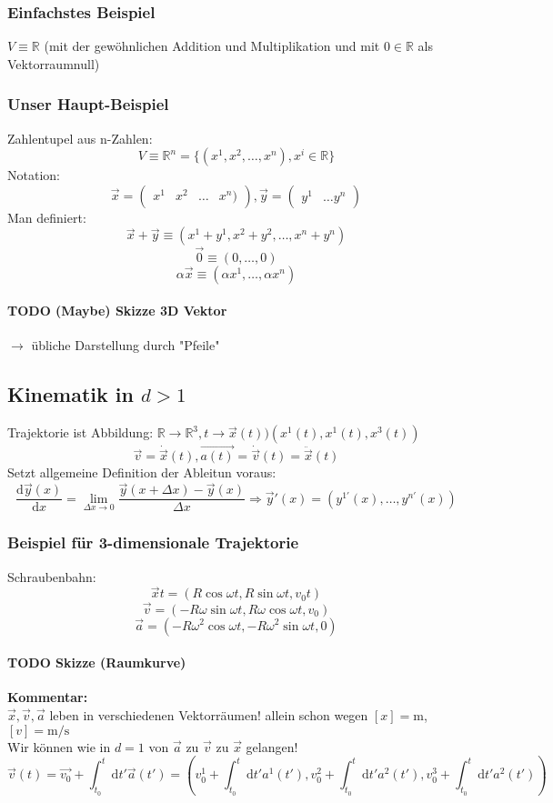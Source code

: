 \documentclass[a4paper]{scrartcl}
\theoremstyle{definition}
\theoremstyle{plain}
\theoremstyle{remark}
\begin{document}
\subsubsection{Einfachstes Beispiel}
\label{sec-2-4-1}
$V\equiv \mathbb{R}$ (mit der gewöhnlichen Addition und Multiplikation und mit $0\in\mathbb{R}$ als Vektorraumnull)
\subsubsection{Unser Haupt-Beispiel}
\label{sec-2-4-2}
Zahlentupel aus n-Zahlen:
\[V\equiv \mathbb{R}^n = \{(x^1,x^2,\ldots,x^n), x^i \in\mathbb{R}\}\]
Notation:
\[\vec{x} = \begin{pmatrix} x^1& x^2 & \ldots & x^n)\end{pmatrix}, \vec{y} = \begin{pmatrix} y^1 & \ldots y^n \end{pmatrix}\]
Man definiert:
\[\vec{x} + \vec{y} \equiv (x^1 + y^1, x^2 + y^2, \ldots, x^n + y^n)\]
\[\vec{0} \equiv (0,\ldots,0)\]
\[\alpha \vec{x} \equiv (\alpha x^1, \ldots, \alpha x^n)\]
\paragraph{{\bfseries\sffamily TODO} (Maybe) Skizze 3D Vektor}
\label{sec-2-4-2-1}
$\rightarrow$ übliche Darstellung durch "Pfeile"
\subsection{Kinematik in $d>1$}
\label{sec-2-5}
Trajektorie ist Abbildung: $\mathbb{R} \to \mathbb{R}^3, t\to \vec{x}(t) ) (x^1(t),x^1(t),x^3(t))$
\[\vec{v} = \dot{\vec{x}}(t), \vec{a(t)} = \dot{\vec{v}}(t) = \ddot{\vec{x}}(t)\]
Setzt allgemeine Definition der Ableitun voraus:
\[\frac{\mathrm{d}\vec{y}(x)}{\mathrm{d}x} = \lim_{\Delta x \to 0} \frac{\vec{y}(x + \Delta x) - \vec{y}(x)}{\Delta x}  \Rightarrow \vec{y}'(x) = (y^{1'}(x), \ldots,y^{n'}(x))\]
\subsubsection{Beispiel für 3-dimensionale Trajektorie}
\label{sec-2-5-1}
Schraubenbahn:
\[\vec{x}t = (R\cos{\omega t},R\sin{\omega t}, v_0 t)\]
\[\vec{v} = (-R\omega\sin{\omega t}, R\omega\cos{\omega t}, v_0)\]
\[\vec{a} = (-R\omega^2\cos{\omega t}, -R\omega^2\sin{\omega t}, 0)\]
\paragraph{{\bfseries\sffamily TODO} Skizze (Raumkurve)}
\label{sec-2-5-1-1}
\textbf{Kommentar:} \\
     $\vec{x},\vec{v},\vec{a}$ leben in verschiedenen Vektorräumen!
allein schon wegen $[x] = \si{\meter}$, $[v] = \si{\meter\per\second}$ \\
     Wir können wie in $d=1$ von $\vec{a}$ zu $\vec{v}$ zu $\vec{x}$ gelangen!
\[\vec{v}(t) = \vec{v_0} + \int_{t_0}^{t} \mathrm{d}t' \vec{a}(t') = (v_0^1 + \int_{t_0}^t \mathrm{d}t' a^1(t'), v_0^2 + \int_{t_0}^t \mathrm{d}t' a^2(t'), v_0^3 + \int_{t_0}^t \mathrm{d}t' a^2(t'))\]
\end{document}
